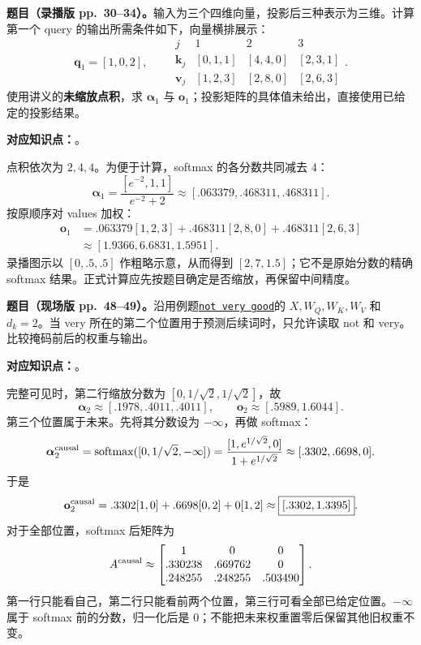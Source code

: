 \nopagebreak[4]
\textbf{题目（录播版 pp.~30--34）。}输入为三个四维向量，投影后三种表示为三维。计算第一个 query 的输出所需条件如下，向量横排展示：
\[
 \mathbf q_1=[1,0,2],\qquad
 \begin{array}{c|ccc}
 j&1&2&3\\\hline
 \mathbf k_j&[0,1,1]&[4,4,0]&[2,3,1]\\
 \mathbf v_j&[1,2,3]&[2,8,0]&[2,6,3]
 \end{array}.
\]
使用讲义的\textbf{未缩放点积}，求 $\boldsymbol\alpha_1$ 与 $\mathbf o_1$；投影矩阵的具体值未给出，直接使用已给定的投影结果。

\textbf{对应知识点：}。

\begin{workedsolution}
点积依次为 $2,4,4$。为便于计算，softmax 的各分数共同减去 $4$：
\[
 \boldsymbol\alpha_1
 =\frac{[e^{-2},1,1]}{e^{-2}+2}
 \approx[.063379,.468311,.468311].
\]
按原顺序对 values 加权：
\begin{align*}
 \mathbf o_1
 &=.063379[1,2,3]+.468311[2,8,0]+.468311[2,6,3]\\
 &\approx\boxed{[1.9366,6.6831,1.5951]}.
\end{align*}
录播图示以 $[0,.5,.5]$ 作粗略示意，从而得到 $[2,7,1.5]$；它不是原始分数的精确 softmax 结果。正式计算应先按题目确定是否缩放，再保留中间精度。
\end{workedsolution}

\nopagebreak[4]
\textbf{题目（现场版 pp.~48--49）。}沿用例题\hyperref[exercise:SC4002-L11-E02]{\texttt{not very good}}的 $X,W_Q,W_K,W_V$ 和 $d_k=2$。当 very 所在的第二个位置用于预测后续词时，只允许读取 not 和 very。比较掩码前后的权重与输出。

\textbf{对应知识点：}。

\begin{workedsolution}
完整可见时，第二行缩放分数为 $[0,1/\sqrt2,1/\sqrt2]$，故
\[
 \boldsymbol\alpha_2\approx[.1978,.4011,.4011],\qquad
 \mathbf o_2\approx[.5989,1.6044].
\]
第三个位置属于未来。先将其分数设为 $-\infty$，再做 softmax：
\[
 \boldsymbol\alpha_2^{\rm causal}
 =\operatorname{softmax}([0,1/\sqrt2,-\infty])
 =\frac{[1,e^{1/\sqrt2},0]}{1+e^{1/\sqrt2}}
 \approx[.3302,.6698,0].
\]
于是
\[
 \mathbf o_2^{\rm causal}
 =.3302[1,0]+.6698[0,2]+0[1,2]
 \approx\boxed{[.3302,1.3395]}.
\]
对于全部位置，softmax 后矩阵为
\[
 A^{\rm causal}\approx\begin{bmatrix}
 1&0&0\\.330238&.669762&0\\.248255&.248255&.503490
 \end{bmatrix}.
\]
第一行只能看自己，第二行只能看前两个位置，第三行可看全部已给定位置。$-\infty$ 属于 softmax 前的分数，归一化后是 $0$；不能把未来权重置零后保留其他旧权重不变。
\end{workedsolution}
\endgroup
